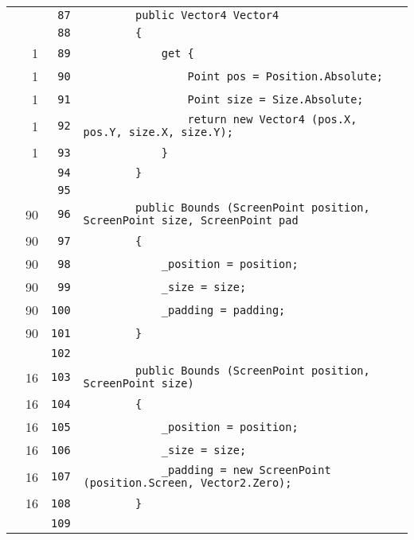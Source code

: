 \documentclass[a4paper,10pt]{article}
\begin{document}
\begin{longtable}[l]{lrrl}
\cellcolor{gray} &  & \verb~87~ & \verb~        public Vector4 Vector4~\\
\cellcolor{gray} &  & \verb~88~ & \verb~        {~\\
\cellcolor{green} & 1 & \verb~89~ & \verb~            get {~\\
\cellcolor{green} & 1 & \verb~90~ & \verb~                Point pos = Position.Absolute;~\\
\cellcolor{green} & 1 & \verb~91~ & \verb~                Point size = Size.Absolute;~\\
\cellcolor{green} & 1 & \verb~92~ & \verb~                return new Vector4 (pos.X, pos.Y, size.X, size.Y);~\\
\cellcolor{green} & 1 & \verb~93~ & \verb~            }~\\
\cellcolor{gray} &  & \verb~94~ & \verb~        }~\\
\cellcolor{gray} &  & \verb~95~ & \verb~~\\
\cellcolor{green} & 90 & \verb~96~ & \verb~        public Bounds (ScreenPoint position, ScreenPoint size, ScreenPoint pad~\\
\cellcolor{green} & 90 & \verb~97~ & \verb~        {~\\
\cellcolor{green} & 90 & \verb~98~ & \verb~            _position = position;~\\
\cellcolor{green} & 90 & \verb~99~ & \verb~            _size = size;~\\
\cellcolor{green} & 90 & \verb~100~ & \verb~            _padding = padding;~\\
\cellcolor{green} & 90 & \verb~101~ & \verb~        }~\\
\cellcolor{gray} &  & \verb~102~ & \verb~~\\
\cellcolor{green} & 16 & \verb~103~ & \verb~        public Bounds (ScreenPoint position, ScreenPoint size)~\\
\cellcolor{green} & 16 & \verb~104~ & \verb~        {~\\
\cellcolor{green} & 16 & \verb~105~ & \verb~            _position = position;~\\
\cellcolor{green} & 16 & \verb~106~ & \verb~            _size = size;~\\
\cellcolor{green} & 16 & \verb~107~ & \verb~            _padding = new ScreenPoint (position.Screen, Vector2.Zero);~\\
\cellcolor{green} & 16 & \verb~108~ & \verb~        }~\\
\cellcolor{gray} &  & \verb~109~ & \verb~~\\

\end{longtable}
\end{document}
